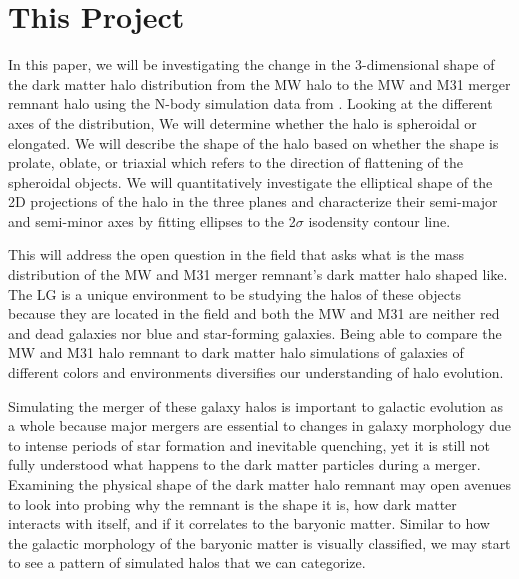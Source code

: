 \documentclass[linenumbers, twocolumn]{aastex631}
\begin{document}
\section{This Project} \label{sec:project}

In this paper, we will be investigating the change in the 3-dimensional shape of the dark matter halo distribution from the MW halo to the MW and M31 merger remnant halo using the N-body simulation data from \cite{2012VanDerMarel}. 
Looking at the different axes of the distribution, We will determine whether the halo is spheroidal or elongated. 
We will describe the shape of the halo based on whether the shape is prolate, oblate, or triaxial which refers to the direction of flattening of the spheroidal objects.
We will quantitatively investigate the elliptical shape of the 2D projections of the halo in the three planes and characterize their semi-major and semi-minor axes by fitting ellipses to the 2$\sigma$ isodensity contour line.

This will address the open question in the field that asks what is the mass distribution of the MW and M31 merger remnant's dark matter halo shaped like. The LG is a unique environment to be studying the halos of these objects because they are located in the field and both the MW and M31 are neither red and dead galaxies nor blue and star-forming galaxies. Being able to compare the MW and M31 halo remnant to dark matter halo simulations of galaxies of different colors and environments diversifies our understanding of halo evolution.


Simulating the merger of these galaxy halos is important to galactic evolution as a whole because major mergers are essential to changes in galaxy morphology due to intense periods of star formation and inevitable quenching, yet it is still not fully understood what happens to the dark matter particles during a merger. Examining the physical shape of the dark matter halo remnant may open avenues to look into probing why the remnant is the shape it is, how dark matter interacts with itself, and if it correlates to the baryonic matter. Similar to how the galactic morphology of the baryonic matter is visually classified, we may start to see a pattern of simulated halos that we can categorize.
\end{document}

